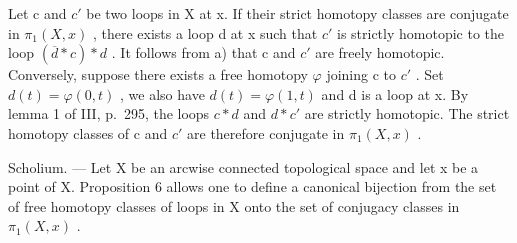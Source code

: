 Let c and \(c'\) be two loops in X at x. If their strict homotopy classes are conjugate in \(\pi_{1}(X,x)\) , there exists a loop d at x such that \(c'\) is strictly homotopic to the loop \((\overline{d} * c) * d\) . It follows from a) that c and \(c'\) are freely homotopic. Conversely, suppose there exists a free homotopy \(\varphi\) joining c to \(c'\) . Set \(d(t) = \varphi(0,t)\) , we also have \(d(t) = \varphi(1,t)\) and d is a loop at x. By lemma 1 of III, p.~295, the loops \(c * d\) and \(d * c'\) are strictly homotopic. The strict homotopy classes of c and \(c'\) are therefore conjugate in \(\pi_{1}(X,x)\) .

Scholium. --- Let X be an arcwise connected topological space and let x be a point of X. Proposition 6 allows one to define a canonical bijection from the set of free homotopy classes of loops in X onto the set of conjugacy classes in \(\pi_{1}(X,x)\) .

